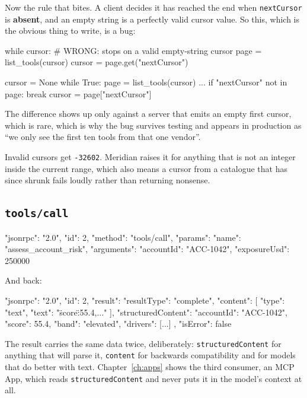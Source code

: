 Now the rule that bites. A client decides it has reached the end when
\texttt{nextCursor} is \textbf{absent}, and an empty string is a perfectly valid
cursor value. So this, which is the obvious thing to write, is a bug:

\begin{plain}
while cursor:            # WRONG: stops on a valid empty-string cursor
    page = list_tools(cursor)
    cursor = page.get("nextCursor")
\end{plain}

\begin{plain}
cursor = None
while True:
    page = list_tools(cursor)
    ...
    if "nextCursor" not in page:
        break
    cursor = page["nextCursor"]
\end{plain}

The difference shows up only against a server that emits an empty first cursor,
which is rare, which is why the bug survives testing and appears in production
as ``we only see the first ten tools from that one vendor''.

Invalid cursors get \texttt{-32602}. Meridian raises it for anything that is not
an integer inside the current range, which also means a cursor from a catalogue
that has since shrunk fails loudly rather than returning nonsense.

\subsection{\texttt{tools/call}}

\begin{wire}
{
  "jsonrpc": "2.0",
  "id": 2,
  "method": "tools/call",
  "params": {
    "name": "assess_account_risk",
    "arguments": { "accountId": "ACC-1042", "exposureUsd": 250000 }
  }
}
\end{wire}

And back:

\begin{wire}
{
  "jsonrpc": "2.0",
  "id": 2,
  "result": {
    "resultType": "complete",
    "content": [{ "type": "text", "text": "{\"score\":55.4,...}" }],
    "structuredContent": { "accountId": "ACC-1042", "score": 55.4,
                           "band": "elevated", "drivers": [...] },
    "isError": false
  }
}
\end{wire}

The result carries the same data twice, deliberately: \texttt{structuredContent} for anything that will parse it,
\texttt{content} for backwards compatibility and for models that do better with
text. Chapter~\ref{ch:apps} shows the third consumer, an MCP App, which reads
\texttt{structuredContent} and never puts it in the model's context at all.

